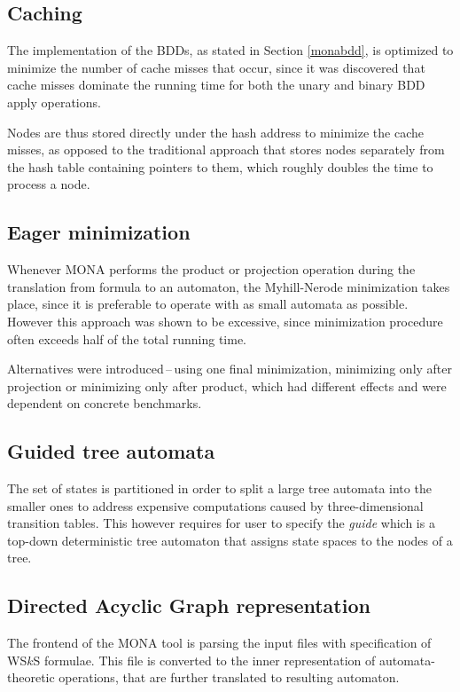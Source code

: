 \subsection{Caching}
The implementation of the BDDs, as stated in Section \ref{monabdd}, is optimized
to minimize the number of cache misses that occur, since it was discovered that
cache misses dominate the running time for both the unary and binary BDD apply
operations.

Nodes are thus stored directly under the hash address to minimize the cache
misses, as opposed to the traditional approach that stores nodes separately from
the hash table containing pointers to them, which roughly doubles the time to
process a node.

\subsection{Eager minimization}
Whenever MONA performs the product or projection operation during the
translation from formula to an automaton, the Myhill-Nerode minimization takes
place, since it is preferable to operate with as small automata as possible.
However this approach was shown to be excessive, since minimization procedure
often exceeds half of the total running time.

Alternatives were introduced\,--\,using one final minimization, minimizing only
after projection or minimizing only after product, which had different effects
and were dependent on concrete benchmarks.

\subsection{Guided tree automata}

The set of states is partitioned in order to split a large tree automata into
the smaller ones to address expensive computations caused by three-dimensional
transition tables. This however requires for user to specify the \emph{guide}
which is a top-down deterministic tree automaton that assigns state spaces to
the nodes of a tree.

\subsection{Directed Acyclic Graph representation}\label{dag}

The frontend of the MONA tool is parsing the input files with specification of
WS$k$S formulae. This file is converted to the inner representation of
automata-theoretic operations, that are further translated to resulting
automaton.

